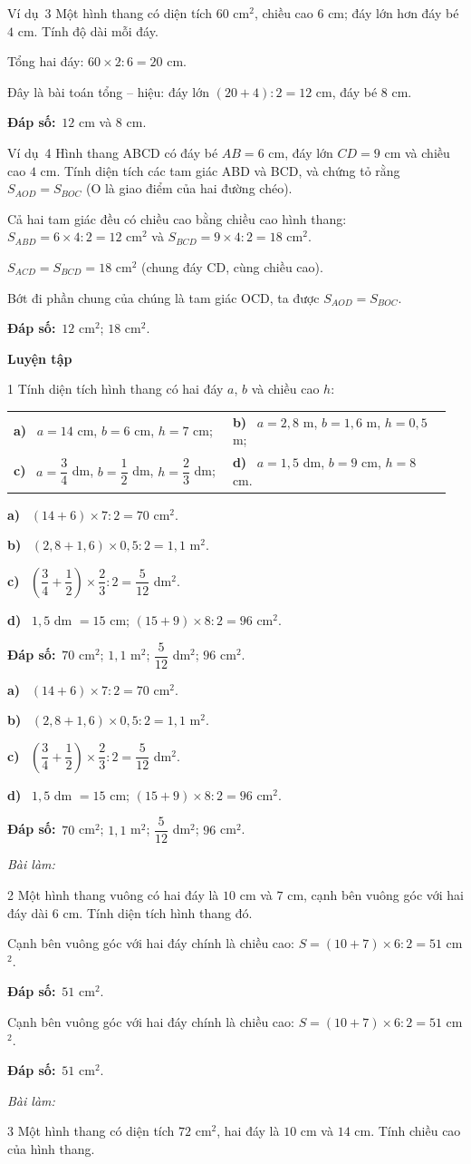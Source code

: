 \documentclass[11pt]{article}
\makeatletter
\newif\ifsol \soltrue
\renewcommand{\arraystretch}{1.35}
\providecommand{\AnsWord}{Đáp số}
\newcommand{\dapso}[1]{\par\textbf{\AnsWord:}\ #1}
\newcommand{\guide}{\par\vspace{4pt}{\bfseries\color{tmBlue}\GuideWord}\par\vspace{3pt}\nopagebreak}
\newcommand{\probsol}[1]{%
  \begin{lrbox}{\solmeasure}\begin{minipage}{\dimexpr\linewidth-24pt\relax}#1\end{minipage}\end{lrbox}%
  \ifsol
    \begin{solbox}#1\end{solbox}%
  \else
    \setlength{\solht}{\dimexpr\ht\solmeasure+\dp\solmeasure+0.85cm\relax}%
    \ifdim\solht<1.35cm\setlength{\solht}{1.35cm}\fi
    \begin{tcolorbox}[colback=white,colframe=Line,boxrule=0.8pt,arc=5pt,
      left=8pt,right=8pt,top=4pt,bottom=4pt,height=\solht]{\footnotesize\color{Slate}\itshape\WorkWord}\end{tcolorbox}%
  \fi}
\newcommand{\dividerbar}[1]{\par\vspace{0.6em}\noindent
  \begin{tcolorbox}[enhanced,frame hidden,interior hidden,borderline west={5pt}{0pt}{ProbBlue},
    colback=white,left=12pt,right=12pt,top=5pt,bottom=5pt,arc=4pt]
  {\large\bfseries\color{ProbBlue} #1}\end{tcolorbox}\vspace{0.4em}}
\newcommand{\pa}[1]{\textbf{#1)}\ }
\newenvironment{cols2}{\par\vspace{3pt}\noindent\setlength{\tabcolsep}{0pt}\renewcommand{\arraystretch}{1.3}%
  \begin{tabular}{@{}>{\raggedright\arraybackslash\rule{0pt}{4.4ex}}p{0.48\linewidth}<{\rule[-2.3ex]{0pt}{0pt}}@{\hspace{0.03\linewidth}}>{\raggedright\arraybackslash\rule{0pt}{4.4ex}}p{0.48\linewidth}<{\rule[-2.3ex]{0pt}{0pt}}@{}}}%
  {\end{tabular}\par}
\newcommand{\gap}{\vspace{0.3cm}}
\def\GuideWord{Hướng dẫn giải.}
\def\WorkWord{Bài làm:}
\def\AnsWord{Đáp số}
\def\ExWord{Ví dụ}
\makeatother
\begin{document}
\gap
\begin{exbox}{\ExWord\ 3}
Một hình thang có diện tích $60$ cm$^2$, chiều cao $6$ cm; đáy lớn hơn đáy bé $4$ cm. Tính độ dài mỗi đáy.
\guide
Tổng hai đáy: $60\times2:6=20$ cm.\par Đây là bài toán tổng -- hiệu: đáy lớn $(20+4):2=12$ cm, đáy bé $8$ cm.
\dapso{$12$ cm và $8$ cm.}
\end{exbox}
\gap
\begin{exbox}{\ExWord\ 4}
Hình thang ABCD có đáy bé $AB=6$ cm, đáy lớn $CD=9$ cm và chiều cao $4$ cm. Tính diện tích các tam giác ABD và BCD, và chứng tỏ rằng $S_{AOD}=S_{BOC}$ (O là giao điểm của hai đường chéo).
\guide
Cả hai tam giác đều có chiều cao bằng chiều cao hình thang: $S_{ABD}=6\times4:2=12$ cm$^2$ và $S_{BCD}=9\times4:2=18$ cm$^2$.\par
$S_{ACD}=S_{BCD}=18$ cm$^2$ (chung đáy CD, cùng chiều cao).\par Bớt đi phần chung của chúng là tam giác OCD, ta được $S_{AOD}=S_{BOC}$.
\dapso{$12$ cm$^2$; $18$ cm$^2$.}
\end{exbox}
\dividerbar{Luyện tập}
\begin{probbox}{1}{\relax}
Tính diện tích hình thang có hai đáy $a$, $b$ và chiều cao $h$:
\begin{cols2}
\pa{a} $a=14$ cm, $b=6$ cm, $h=7$ cm; & \pa{b} $a=2{,}8$ m, $b=1{,}6$ m, $h=0{,}5$ m;\\
\pa{c} $a=\dfrac34$ dm, $b=\dfrac12$ dm, $h=\dfrac23$ dm; & \pa{d} $a=1{,}5$ dm, $b=9$ cm, $h=8$ cm.
\end{cols2}
\end{probbox}
\probsol{
\pa{a} $(14+6)\times7:2=70$ cm$^2$.\par \pa{b} $(2{,}8+1{,}6)\times0{,}5:2=1{,}1$ m$^2$.\par \pa{c} $\left(\dfrac34+\dfrac12\right)\times\dfrac23:2=\dfrac5{12}$ dm$^2$.\par \pa{d} $1{,}5$ dm $=15$ cm; $(15+9)\times8:2=96$ cm$^2$.
\dapso{$70$ cm$^2$; $1{,}1$ m$^2$; $\dfrac5{12}$ dm$^2$; $96$ cm$^2$.}}
\gap
\begin{probbox}{2}{\relax}
Một hình thang vuông có hai đáy là $10$ cm và $7$ cm, cạnh bên vuông góc với hai đáy dài $6$ cm. Tính diện tích hình thang đó.
\end{probbox}
\probsol{
Cạnh bên vuông góc với hai đáy chính là chiều cao: $S=(10+7)\times6:2=51$ cm$^2$.
\dapso{$51$ cm$^2$.}}
\gap
\begin{probbox}{3}{\relax}
Một hình thang có diện tích $72$ cm$^2$, hai đáy là $10$ cm và $14$ cm. Tính chiều cao của hình thang.
\end{probbox}
\end{document}
